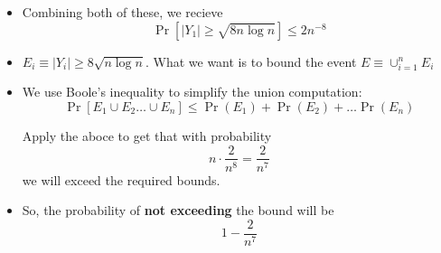 \begin{itemize}
    \item Combining both of these, we recieve 
    $$
    \Pr[|Y_1| \geq \sqrt{8 n \log n}] \leq 2 n^{-8}
    $$


    \item $E_i \equiv |Y_i| \geq 8 \sqrt{n \log n}$. What we want is to bound
    the event $E \equiv \cup_{i=1}^n E_i$

    \item We use Boole's inequality to simplify the union computation:
    $$\Pr[E_1 \cup E_2 \dots \cup E_n] \leq \Pr(E_1) + \Pr(E_2) + \dots \Pr(E_n)$$


    Apply the aboce to get that with probability $$n \cdot \frac{2}{n^8} = \frac{2}{n^7}$$
    we will exceed the required bounds.

    \item So, the probability of \textbf{not exceeding} the bound will be
    $$1 - \frac{2}{n^7}$$
\end{itemize}
